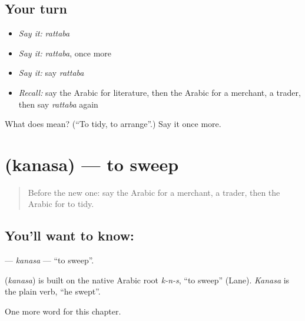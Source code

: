 \subsection*{Your turn}
\begin{itemize}
\raggedright
  \item \emph{Say it:} \emph{rattaba}
  \item \emph{Say it:} \emph{rattaba}, once more
  \item \emph{Say it:} say \emph{rattaba}
  \item \emph{Recall:} say the Arabic for literature, then the Arabic for a merchant, a trader, then say \emph{rattaba} again
\end{itemize}

\begin{tcolorbox}[breakable,colback=teal!4,colframe=teal!35!black,title={Before you move on}]
What does  mean? (\textquotedblleft{}To tidy, to arrange\textquotedblright{}.) Say it once more.
\end{tcolorbox}
\section[\texorpdfstring{\ar{كنس} (kanasa)}{كنس (kanasa)}]{ (kanasa) — to sweep}

\label{lesson:AR-C223-kanasa}



\begin{quote}
Before the new one: say the Arabic for a merchant, a trader, then the Arabic for to tidy.
\end{quote}

\subsection*{You'll want to know: }
\textbf{} — \emph{kanasa} — \textquotedblleft{}to sweep\textquotedblright{}.

\begin{cousinweb}
\textbf{} (\emph{kanasa}) is built on the native Arabic root \emph{k-n-s}, \textquotedblleft{}to sweep\textquotedblright{} (Lane). \emph{Kanasa} is the plain verb, \textquotedblleft{}he swept\textquotedblright{}.
\end{cousinweb}

\begin{grammarlens}[title={What you've built}]
One more word for this chapter.
\end{grammarlens}

